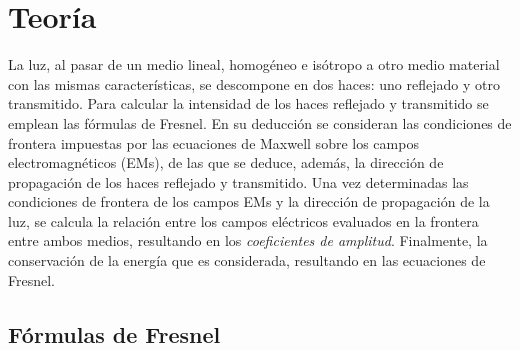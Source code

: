\chapter{Teoría}

La luz, al pasar de un medio lineal, homogéneo e isótropo a otro medio material con las mismas características, se descompone en dos haces: uno reflejado y otro transmitido. Para calcular la intensidad de los haces reflejado y transmitido se emplean las fórmulas de Fresnel. En su deducción se consideran las condiciones de frontera impuestas por las ecuaciones de Maxwell sobre los campos electromagnéticos (EMs), de las que se deduce, además, la dirección de propagación de los haces reflejado y transmitido.  Una vez determinadas las condiciones de frontera de los campos EMs y la dirección de propagación de la luz, se calcula la relación  entre los campos eléctricos evaluados en la frontera entre ambos medios, resultando en los \emph{coeficientes de amplitud}. Finalmente, la conservación de la energía que es considerada, resultando en las ecuaciones de Fresnel.


\section{Fórmulas de Fresnel}


